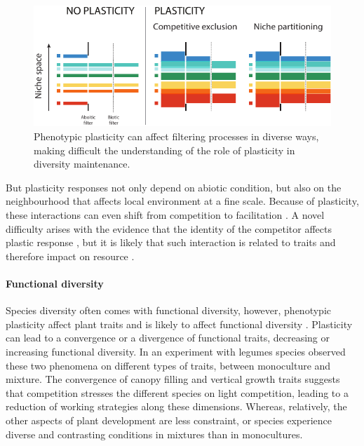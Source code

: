 {\begin{figure}
    \includegraphics[width=1\linewidth]{./1_Introduction/graphics/filtering.pdf}
  \caption[Effect of plasticity of filters]{Phenotypic plasticity can affect filtering processes in diverse ways, making difficult the understanding of the role of plasticity in diversity maintenance.}
  \label{fig:plasticity_form}
\end{figure}

But plasticity responses not only depend on abiotic condition, but also on the neighbourhood that affects local environment \parencite{sultan_phenotypic_1995} at a fine scale. Because of plasticity, these interactions can even shift from competition to facilitation \cite{callaway_phenotypic_2003}. A novel difficulty arises with the evidence that the identity of the competitor affects plastic response \parencite{callaway_phenotypic_2003, abakumova_plasticity_2016}, but it is likely that such interaction is related to traits and therefore impact on resource \parencite{callaway_phenotypic_2003}.

\paragraph{Functional diversity}

Species diversity often comes with functional diversity, however, phenotypic plasticity affect plant traits and is likely to affect functional diversity \parencite{albert_importance_2012}. Plasticity can lead to a convergence or a divergence of functional traits, decreasing or increasing functional diversity. In an experiment with legumes species \cite{roscher_contrasting_2015} observed these two phenomena on different types of traits, between monoculture and mixture. The convergence of canopy filling and vertical growth traits suggests that competition stresses the different species on light competition, leading to a reduction of working strategies along these dimensions. Whereas, relatively, the other aspects of plant development are less constraint, or species experience diverse and contrasting conditions in mixtures than in monocultures.



}
